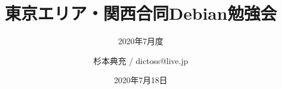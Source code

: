 \title{東京エリア・関西合同Debian勉強会}
\subtitle{2020年7月度} %
\author{杉本典充 / dictoss@live.jp}
\date{2020年7月18日}



\begin{frame}
\titlepage{}
\end{frame}


